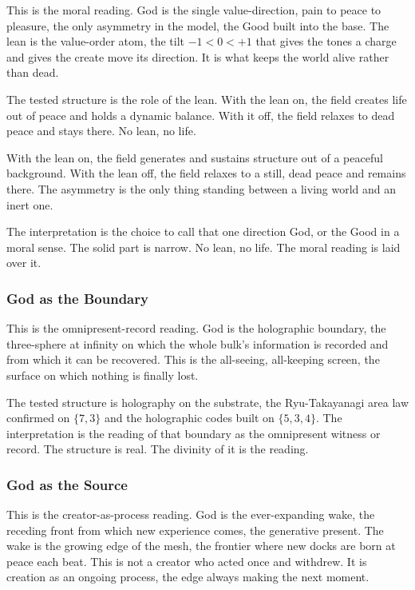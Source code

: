 This is the moral reading. God is the single value-direction, pain to peace to pleasure, the only asymmetry in the model, the Good built into the base. The lean is the value-order atom, the tilt $-1 < 0 < +1$ that gives the tones a charge and gives the create move its direction. It is what keeps the world alive rather than dead.

The tested structure is the role of the lean. With the lean on, the field creates life out of peace and holds a dynamic balance. With it off, the field relaxes to dead peace and stays there. No lean, no life.

\begin{result}
With the lean on, the field generates and sustains structure out of a peaceful background. With the lean off, the field relaxes to a still, dead peace and remains there. The asymmetry is the only thing standing between a living world and an inert one.
\end{result}

The interpretation is the choice to call that one direction God, or the Good in a moral sense. The solid part is narrow. No lean, no life. The moral reading is laid over it.

\subsubsection{God as the Boundary}

This is the omnipresent-record reading. God is the holographic boundary, the three-sphere at infinity on which the whole bulk's information is recorded and from which it can be recovered. This is the all-seeing, all-keeping screen, the surface on which nothing is finally lost.

The tested structure is holography on the substrate, the Ryu-Takayanagi area law confirmed on $\{7,3\}$ and the holographic codes built on $\{5,3,4\}$. The interpretation is the reading of that boundary as the omnipresent witness or record. The structure is real. The divinity of it is the reading.

\subsubsection{God as the Source}

This is the creator-as-process reading. God is the ever-expanding wake, the receding front from which new experience comes, the generative present. The wake is the growing edge of the mesh, the frontier where new docks are born at peace each beat. This is not a creator who acted once and withdrew. It is creation as an ongoing process, the edge always making the next moment.

